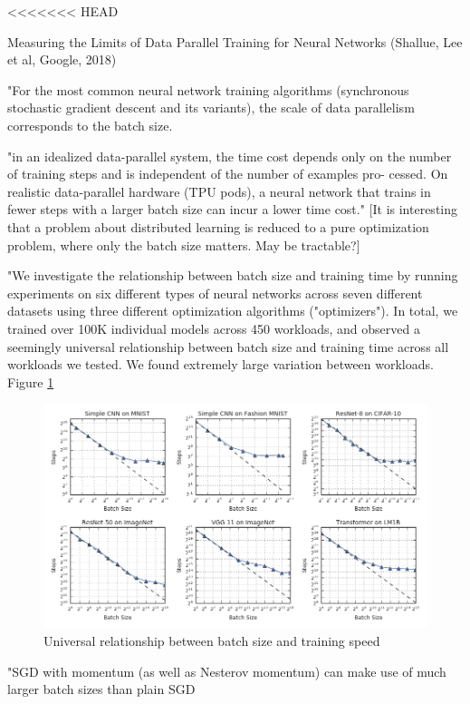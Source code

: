 \documentclass[english]{article}
\begin{document}
<<<<<<< HEAD
\item Measuring the Limits of Data Parallel Training for Neural Networks (Shallue, Lee et al, Google, 2018)

"For the most common neural network training algorithms (synchronous stochastic gradient descent and its variants), the scale of data parallelism corresponds to the batch size.

"in an idealized data-parallel system, the time cost depends
only on the number of training steps and is independent of the number of examples pro-
cessed. On realistic data-parallel hardware (TPU pods),
a neural network that trains in fewer steps with a larger batch size can incur a lower time
cost." [It is interesting that a problem about distributed learning is reduced to a pure optimization problem, where only the batch size matters. May be tractable?]

"We investigate the relationship between batch size and training time by running experiments on six different types of neural networks across seven different datasets using three different optimization algorithms ("optimizers"). In total, we trained over 100K individual models across 450 workloads, and observed a seemingly universal relationship between batch size and training time across all workloads we tested. We found extremely large variation between workloads. Figure \ref{Bsts}

\begin{figure}
\begin{center}
\includegraphics[width=0.7\paperwidth]{bsts}
    \caption{Universal relationship between batch size and training speed}
    \label{Bsts}
\end{center}
\end{figure}

"SGD with momentum (as well as Nesterov momentum) can make use of much
larger batch sizes than plain SGD
\end{document}
